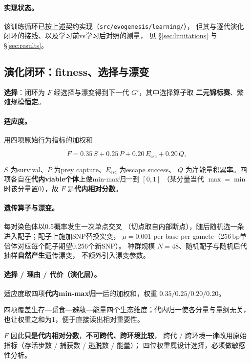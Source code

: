 \paragraph{实现状态。}该训练循环已按上述契约实现（\texttt{src/evogenesis/learning/}），
但其与逐代演化闭环的接线、以及学习前vs学习后对照的测量，
见 \S\ref{sec:limitations} 与 \S\ref{sec:results}。

\subsection{演化闭环：fitness、选择与漂变}\label{method:evo}

\textbf{选择}：闭环为 $F$ 经选择与漂变得到下一代 $G'$，其中选择算子取
\textbf{二元锦标赛}、繁殖规模\textbf{恒定}。

\paragraph{适应度。}用四项原始行为指标的加权和

\begin{equation}\label{method:eq-fitness}
F=0.35\,S+0.25\,P+0.20\,E_{\mathrm{esc}}+0.20\,Q ,
\end{equation}

$S$ 为survival、$P$ 为prey capture、$E_{\mathrm{esc}}$ 为escape success、
$Q$ 为净能量积累率。四项各自在\textbf{代内viable个体}上做min-max归一到 $[0,1]$
（某分量当代 $\max=\min$ 时该分量置0），故 $F$ 是\textbf{代内相对分数}。

\paragraph{遗传算子与漂变。}每对染色体以0.5概率发生一次单点交叉
（切点取自内部断点），随后随机选一条进入配子；配子上施加SNP替换突变，
$\mu=0.001$ per base per gamete（256\,bp单倍体对应每个配子期望0.256个新SNP）。
种群规模 $N=48$、随机配子与随机后代抽样\textbf{自然产生}遗传漂变，
不额外引入漂变参数。

\paragraph{选择 / 理由 / 代价（演化层）。}

\begin{description}
  \item 适应度取四项\textbf{代内min-max归一}后的加权和，权重 $0.35/0.25/0.20/0.20$。
  \item 四项覆盖生存—觅食—避敌—能量四个生态维度；代内归一使各分量与量纲无关，
        也让权重之和为1，便于直接读出相对重要性。
  \item[代价] $F$ 因此\textbf{只是代内相对分数}，\textbf{不可跨代、跨环境比较}，
        跨代 / 跨环境一律改用原始指标（存活步数 / 捕获数 / 逃脱数 / 能量）；
        四位权重属设计选择，必须做敏感性分析。
\end{description}

